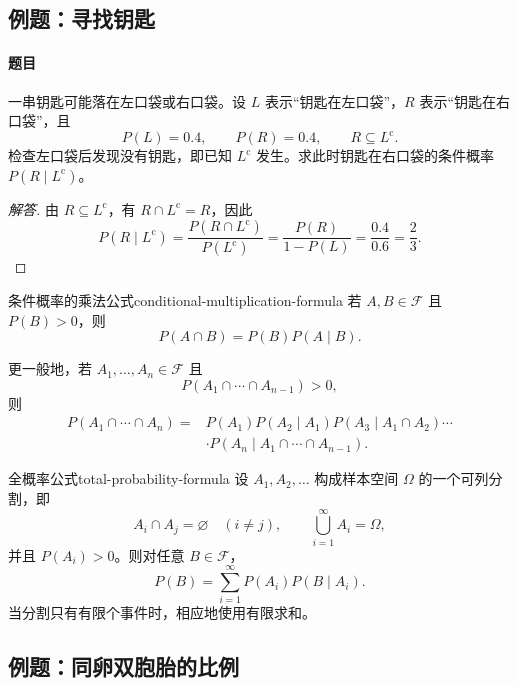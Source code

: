 \subsection{例题：寻找钥匙}\label{note:c1:e15}
\paragraph{题目}
一串钥匙可能落在左口袋或右口袋。设 $L$ 表示“钥匙在左口袋”，$R$ 表示“钥匙在右口袋”，且
\[
P(L)=0.4,\qquad P(R)=0.4,\qquad R\subseteq L^{\mathrm c}.
\]
检查左口袋后发现没有钥匙，即已知 $L^{\mathrm c}$ 发生。求此时钥匙在右口袋的条件概率 $P(R\mid L^{\mathrm c})$。

\begin{proof}[解答]
由 $R\subseteq L^{\mathrm c}$，有 $R\cap L^{\mathrm c}=R$，因此
\[
P(R\mid L^{\mathrm c})
=\frac{P(R\cap L^{\mathrm c})}{P(L^{\mathrm c})}
=\frac{P(R)}{1-P(L)}
=\frac{0.4}{0.6}
=\frac23.
\]
\end{proof}

\begin{mytheorem}{条件概率的乘法公式}{conditional-multiplication-formula}
若 $A,B\in\mathscr{F}$ 且 $P(B)>0$，则
\[
P(A\cap B)=P(B)P(A\mid B).
\]

更一般地，若 $A_1,\ldots,A_n\in\mathscr{F}$ 且
\[
P(A_1\cap\cdots\cap A_{n-1})>0,
\]
则
\[
\begin{aligned}
P(A_1\cap\cdots\cap A_n)
={}&P(A_1)P(A_2\mid A_1)P(A_3\mid A_1\cap A_2)\cdots\\
&\cdot P(A_n\mid A_1\cap\cdots\cap A_{n-1}).
\end{aligned}
\]
\end{mytheorem}

\begin{mytheorem}{全概率公式}{total-probability-formula}
设 $A_1,A_2,\ldots$ 构成样本空间 $\Omega$ 的一个可列分割，即
\[
A_i\cap A_j=\varnothing\quad(i\ne j),
\qquad
\bigcup_{i=1}^{\infty}A_i=\Omega,
\]
并且 $P(A_i)>0$。则对任意 $B\in\mathscr{F}$，
\[
P(B)=\sum_{i=1}^{\infty}P(A_i)P(B\mid A_i).
\]
当分割只有有限个事件时，相应地使用有限求和。
\end{mytheorem}

\subsection{例题：同卵双胞胎的比例}\label{note:c1:e16}
